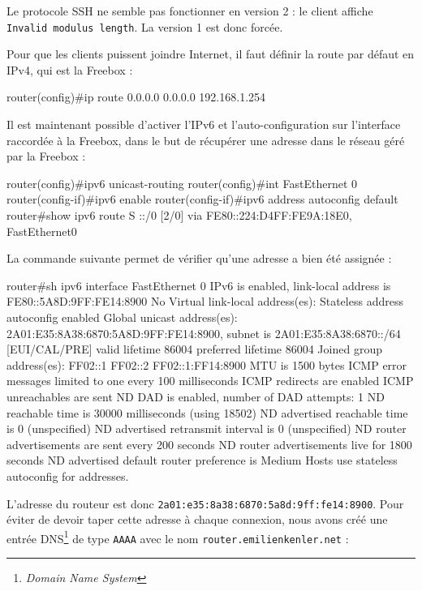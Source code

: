 \begin{warning}
Le protocole SSH ne semble pas fonctionner en version 2 : le client affiche \texttt{Invalid modulus length}.
La version 1 est donc forcée.
\end{warning}

Pour que les clients puissent joindre Internet, il faut définir la route par défaut en IPv4, qui est la Freebox :

\begin{code}
router(config)#ip route 0.0.0.0 0.0.0.0 192.168.1.254
\end{code}

Il est maintenant possible d'activer l’IPv6 et l’auto-configuration sur l’interface raccordée à la Freebox, dans le but de récupérer une adresse dans le réseau géré par la Freebox :

\begin{code}
router(config)#ipv6 unicast-routing 
router(config)#int FastEthernet 0
router(config-if)#ipv6 enable
router(config-if)#ipv6 address autoconfig default
router#show ipv6 route
S   ::/0 [2/0]
     via FE80::224:D4FF:FE9A:18E0, FastEthernet0
\end{code}

La commande suivante permet de vérifier qu'une adresse a bien été assignée :
\begin{code}
router#sh ipv6 interface FastEthernet 0
  IPv6 is enabled, link-local address is FE80::5A8D:9FF:FE14:8900 
  No Virtual link-local address(es):
  Stateless address autoconfig enabled
  Global unicast address(es):
    2A01:E35:8A38:6870:5A8D:9FF:FE14:8900, subnet is 2A01:E35:8A38:6870::/64 [EUI/CAL/PRE]
      valid lifetime 86004 preferred lifetime 86004
  Joined group address(es):
    FF02::1
    FF02::2
    FF02::1:FF14:8900
  MTU is 1500 bytes
  ICMP error messages limited to one every 100 milliseconds
  ICMP redirects are enabled
  ICMP unreachables are sent
  ND DAD is enabled, number of DAD attempts: 1
  ND reachable time is 30000 milliseconds (using 18502)
  ND advertised reachable time is 0 (unspecified)
  ND advertised retransmit interval is 0 (unspecified)
  ND router advertisements are sent every 200 seconds
  ND router advertisements live for 1800 seconds
  ND advertised default router preference is Medium
  Hosts use stateless autoconfig for addresses.
\end{code}

L'adresse du routeur est donc \texttt{2a01:e35:8a38:6870:5a8d:9ff:fe14:8900}.
Pour éviter de devoir taper cette adresse à chaque connexion, nous avons créé une entrée DNS\footnote{\emph{Domain Name System}} de type \texttt{AAAA} avec le nom \texttt{router.emilienkenler.net} :

